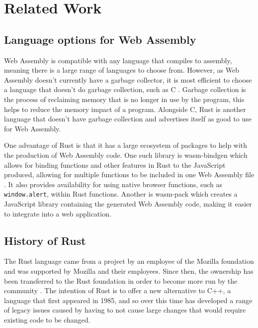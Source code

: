 \documentclass[12pt,a4paper]{article}
\begin{document}
\section{Related Work}

\subsection{Language options for Web Assembly}


Web Assembly is compatible with any language that compiles to assembly, meaning there is a large range of languages to choose from. However, as Web Assembly doesn't currently have a garbage collector, it is most efficient to choose a language that doesn't do garbage collection, such as C \cite{haas2017bringing}. Garbage collection is the process of reclaiming memory that is no longer in use by the program, this helps to reduce the memory impact of a program. Alongside C, Rust is another language that doesn't have garbage collection and advertises itself as good to use for Web Assembly.

One advantage of Rust is that it has a large ecosystem of packages to help with the production of Web Assembly code. One such library is wasm-bindgen which allows for binding functions and other features in Rust to the JavaScript produced, allowing for multiple functions to be included in one Web Assembly file \cite{wasmbindgen}. It also provides availability for using native browser functions, such as \texttt{window.alert}, within Rust functions. Another is wasm-pack which creates a JavaScript library containing the generated Web Assembly code, making it easier to integrate into a web application.


\subsection{History of Rust}


The Rust language came from a project by an employee of the Mozilla foundation and was supported by Mozilla and their employees. Since then, the ownership has been transferred to the Rust foundation in order to become more run by the community \cite{rustfoundation}. The intention of Rust is to offer a new alternative to C++, a language that first appeared in 1985, and so over this time has developed a range of legacy issues caused by having to not cause large changes that would require existing code to be changed.
\end{document}
